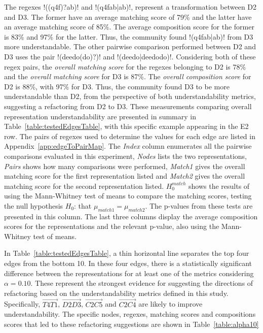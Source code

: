 The regexes \cverb!((q4f)?ab)! and \cverb!(q4fab|ab)!, represent a transformation between D2 and D3. The former have an average matching score of 79\% and the latter have an average matching score of 85\%. The average composition score for the former is 83\% and 97\% for the latter. Thus, the community found \cverb!(q4fab|ab)! from D3 more understandable.
The other pairwise comparison performed between D2 and D3 uses the pair \cverb!(deedo(do)?)! and \cverb!(deedo|deedodo)!.
Considering both of these regex pairs, the \emph{overall matching score} for the regexes belonging to D2 is 78\% and the \emph{overall matching score} for D3 is 87\%.
The \emph{overall composition score} for D2 is 88\%, with 97\% for D3. Thus, the community found D3 to be more understandable than D2, from the perspective of both understandability metrics, suggesting a refactoring from D2 to D3.  These measurements comparing overall representation understandability are presented in summary in Table~\ref{table:testedEdgesTable}, with this specific example appearing in the E2 row. The pairs of regexes used to determine the values for each edge are listed in Appendix~\ref{app:edgeToPairMap}.  The \emph{Index} column enumerates all the pairwise comparisons evaluated in this experiment, \emph{Nodes} lists the two representations, \emph{Pairs} shows how many comparisons were performed, \emph{Match1} gives the overall matching score for the first representation listed and \emph{Match2} gives the overall matching score for the second representation listed. $H_0^{match}$ shows the results of using the Mann-Whitney test of means to compare the matching scores, testing the null hypothesis $H_0$: that $\mu_{match1} = \mu_{match2}$.  The p-values from these tests are presented in this column. The last three columns display the average composition scores for the representations and the relevant p-value, also using the Mann-Whitney test of means.




In Table~\ref{table:testedEdgesTable}, a thin horizontal line separates the top four edges from the bottom 10.  In these four edges, there is a statistically significant difference between the representations for at least one of the metrics considering $\alpha = 0.10$. These represent the strongest evidence for suggesting the directions of refactoring based on the understandability metrics defined in this study. Specifically, $\overrightarrow{T4 T1}$, $\overrightarrow{D2 D3}$, $\overrightarrow{C2 C5}$ and $\overrightarrow{C2 C4}$ are likely to improve understandability.  The specific nodes, regexes, matching scores and compositions scores that led to these refactoring suggestions are shown in Table~\ref{table:alpha10}

